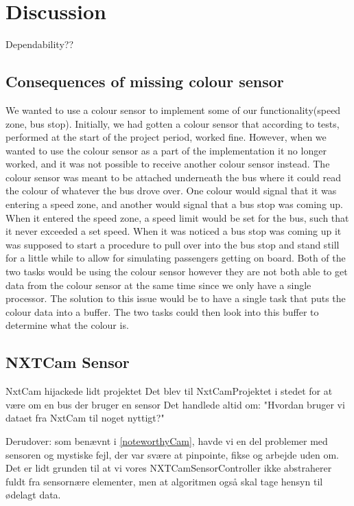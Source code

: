 \section{Discussion}


Dependability??


\subsection{Consequences of missing colour sensor}

We wanted to use a colour sensor to implement some of our functionality(speed zone, bus stop). Initially, we had gotten a colour sensor that according to tests, performed at the start of the project period, worked fine. However, when we wanted to use the colour sensor as a part of the implementation it no longer worked, and it was not possible to receive another colour sensor instead.
The colour sensor was meant to be attached underneath the bus where it could read the colour of whatever the bus drove over. One colour would signal that it was entering a speed zone, and another would signal that a bus stop was coming up. When it entered the speed zone, a speed limit would be set for the bus, such that it never exceeded a set speed. When it was noticed a bus stop was coming up it was supposed to start a procedure to pull over into the bus stop and stand still for a little while to allow for simulating passengers getting on board.
Both of the two tasks would be using the colour sensor however they are not both able to get data from the colour sensor at the same time since we only have a single processor. The solution to this issue would be to have a single task that puts the colour data into a buffer. The two tasks could then look into this buffer to determine what the colour is. 


\subsection{NXTCam Sensor}
NxtCam hijackede lidt projektet
Det blev til NxtCamProjektet i stedet for at være om en bus der bruger en sensor
Det handlede altid om: "Hvordan bruger vi dataet fra NxtCam til noget nyttigt?"

Derudover: som benævnt i \ref{noteworthyCam}, havde vi en del problemer med sensoren og mystiske fejl, der var svære at pinpointe, fikse og arbejde uden om. Det er lidt grunden til at vi vores NXTCamSensorController  ikke abstraherer fuldt fra sensornære elementer, men at algoritmen også skal tage hensyn til ødelagt data. 

